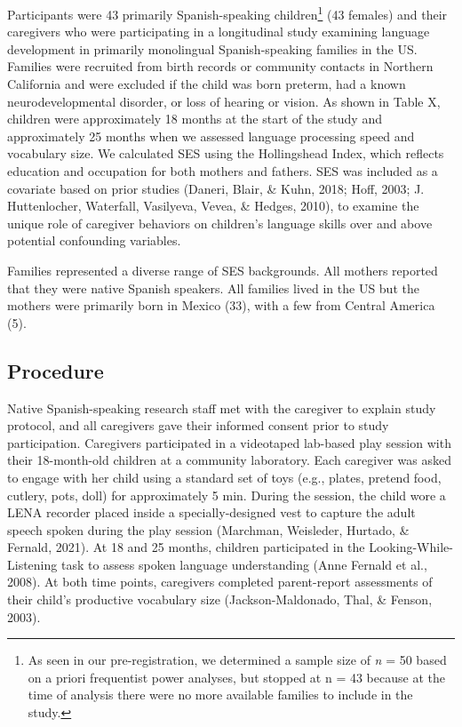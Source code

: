 \documentclass[
  man,floatsintext]{apa6}
\begin{document}
Participants were 43 primarily Spanish-speaking children\footnote{As seen in our pre-registration, we determined a sample size of \emph{n} = 50 based on a priori frequentist power analyses, but stopped at n = 43 because at the time of analysis there were no more available families to include in the study.} (43 females) and their caregivers who were participating in a longitudinal study examining language development in primarily monolingual Spanish-speaking families in the US. Families were recruited from birth records or community contacts in Northern California and were excluded if the child was born preterm, had a known neurodevelopmental disorder, or loss of hearing or vision. As shown in Table X, children were approximately 18 months at the start of the study and approximately 25 months when we assessed language processing speed and vocabulary size. We calculated SES using the Hollingshead Index, which reflects education and occupation for both mothers and fathers. SES was included as a covariate based on prior studies (Daneri, Blair, \& Kuhn, 2018; Hoff, 2003; J. Huttenlocher, Waterfall, Vasilyeva, Vevea, \& Hedges, 2010), to examine the unique role of caregiver behaviors on children's language skills over and above potential confounding variables.

Families represented a diverse range of SES backgrounds. All mothers reported that they were native Spanish speakers. All families lived in the US but the mothers were primarily born in Mexico (33), with a few from Central America (5).

\hypertarget{procedure}{%
\subsection{Procedure}\label{procedure}}

Native Spanish-speaking research staff met with the caregiver to explain study protocol, and all caregivers gave their informed consent prior to study participation. Caregivers participated in a videotaped lab-based play session with their 18-month-old children at a community laboratory. Each caregiver was asked to engage with her child using a standard set of toys (e.g., plates, pretend food, cutlery, pots, doll) for approximately 5 min. During the session, the child wore a LENA recorder placed inside a specially-designed vest to capture the adult speech spoken during the play session (Marchman, Weisleder, Hurtado, \& Fernald, 2021). At 18 and 25 months, children participated in the Looking-While-Listening task to assess spoken language understanding (Anne Fernald et al., 2008). At both time points, caregivers completed parent-report assessments of their child's productive vocabulary size (Jackson-Maldonado, Thal, \& Fenson, 2003).
\end{document}
